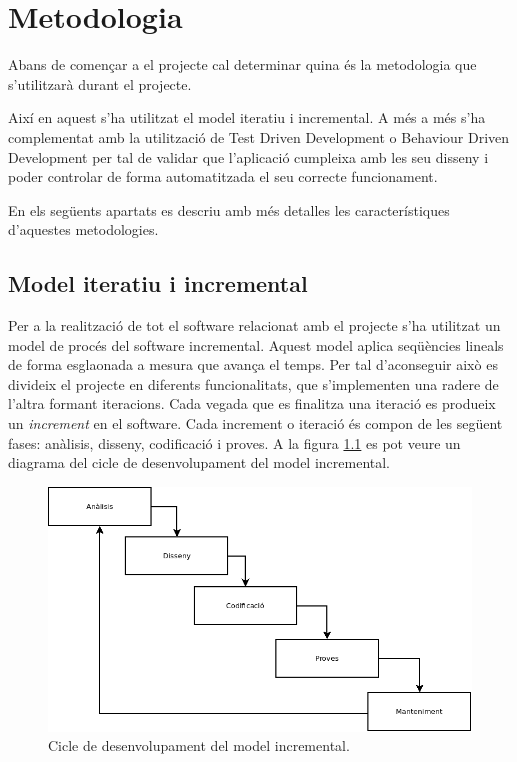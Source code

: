 \chapter{Metodologia}
\label{chap:metodologia}

Abans de començar a el projecte cal determinar quina és la metodologia que s'utilitzarà durant el projecte. 

Així en aquest s'ha utilitzat el model iteratiu i incremental. A més a més s'ha complementat amb la utilització de Test Driven Development o Behaviour Driven Development per tal de validar que l'aplicació cumpleixa amb les seu disseny i poder controlar de forma automatitzada el seu correcte funcionament.

En els següents apartats es descriu amb més detalles les característiques d'aquestes metodologies.  

\section{Model iteratiu i incremental}

Per a la realització de tot el software relacionat amb el projecte s’ha utilitzat un model de procés del software incremental. Aquest model aplica seqüències lineals de forma esglaonada a mesura que avança el temps. Per tal d'aconseguir això es divideix el projecte en diferents funcionalitats, que s'implementen una radere de l'altra formant iteracions. Cada vegada que es finalitza una iteració es produeix un \emph{increment} en el software. Cada increment o iteració és compon de les següent fases: anàlisis, disseny, codificació i proves. A la figura \ref{fig:mii} es pot veure un diagrama del cicle de desenvolupament del model incremental.

\begin{figure}[htbp]
\centering\includegraphics[width=12cm]{img/model-incremental.png}
\caption{Cicle de desenvolupament del model incremental.}
\label{fig:mii}
\end{figure} 

